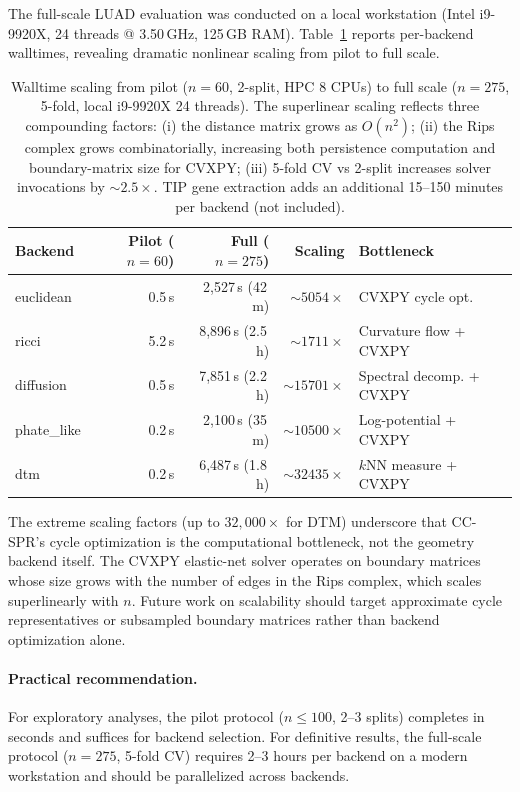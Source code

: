 \documentclass[11pt]{article}
\begin{document}
The full-scale LUAD evaluation was conducted on a local workstation (Intel i9-9920X, 24 threads @ 3.50\,GHz, 125\,GB RAM).
Table~\ref{tab:supp_scaling} reports per-backend walltimes, revealing dramatic nonlinear scaling from pilot to full scale.

\begin{table}[h]
\centering\small
\begin{tabular}{lrrrl}
\toprule
Backend & Pilot ($n=60$) & Full ($n=275$) & Scaling & Bottleneck \\
\midrule
euclidean & 0.5\,s & 2,527\,s (42\,m) & ${\sim}5054\times$ & CVXPY cycle opt. \\
ricci & 5.2\,s & 8,896\,s (2.5\,h) & ${\sim}1711\times$ & Curvature flow + CVXPY \\
diffusion & 0.5\,s & 7,851\,s (2.2\,h) & ${\sim}15701\times$ & Spectral decomp. + CVXPY \\
phate\_like & 0.2\,s & 2,100\,s (35\,m) & ${\sim}10500\times$ & Log-potential + CVXPY \\
dtm & 0.2\,s & 6,487\,s (1.8\,h) & ${\sim}32435\times$ & $k$NN measure + CVXPY \\
\bottomrule
\end{tabular}
\caption{Walltime scaling from pilot ($n = 60$, 2-split, HPC 8 CPUs) to full scale ($n = 275$, 5-fold, local i9-9920X 24 threads).
The superlinear scaling reflects three compounding factors: (i) the distance matrix grows as $O(n^2)$; (ii) the Rips complex grows combinatorially, increasing both persistence computation and boundary-matrix size for CVXPY; (iii) 5-fold CV vs 2-split increases solver invocations by ${\sim}2.5\times$.
TIP gene extraction adds an additional 15--150 minutes per backend (not included).}
\label{tab:supp_scaling}
\end{table}

The extreme scaling factors (up to $32{,}000\times$ for DTM) underscore that CC-SPR's cycle optimization is the computational bottleneck, not the geometry backend itself.
The CVXPY elastic-net solver operates on boundary matrices whose size grows with the number of edges in the Rips complex, which scales superlinearly with $n$.
Future work on scalability should target approximate cycle representatives or subsampled boundary matrices rather than backend optimization alone.

\paragraph{Practical recommendation.}
For exploratory analyses, the pilot protocol ($n \leq 100$, 2--3 splits) completes in seconds and suffices for backend selection.
For definitive results, the full-scale protocol ($n = 275$, 5-fold CV) requires 2--3 hours per backend on a modern workstation and should be parallelized across backends.
\end{document}
